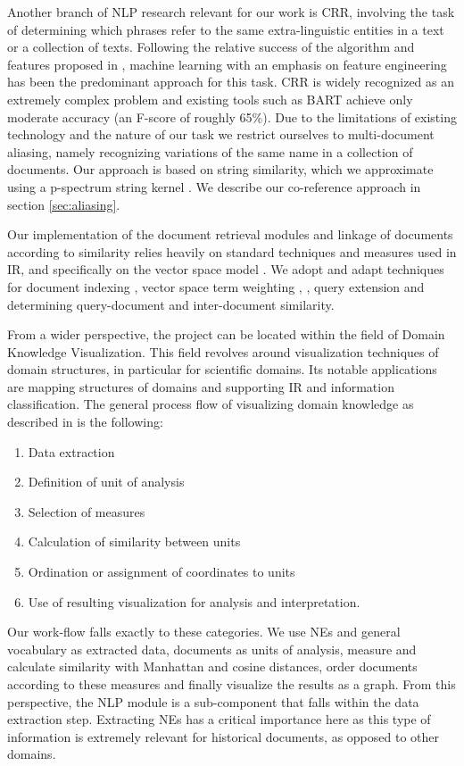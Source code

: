 Another branch of NLP research relevant for our work is CRR, involving the task of determining which phrases refer to the same extra-linguistic entities in a text or a collection of texts.
Following the relative success of the algorithm and features proposed in \cite {soon2001coreference}, machine learning 
with an emphasis on feature engineering has been the predominant approach for this task. CRR is widely 
recognized as an extremely complex problem and existing tools such as BART \cite{bart} achieve only moderate accuracy (an F-score of roughly 65\%). Due to the limitations of existing technology and the nature of our task we restrict ourselves to multi-document aliasing, namely recognizing variations of the same name in a collection of documents. Our approach is based on string similarity, 
which we approximate using a p-spectrum string kernel \cite{kernels2004}. We describe our co-reference approach in section \ref{sec:aliasing}.

Our implementation of the document retrieval modules and linkage of documents according to similarity relies heavily on standard techniques 
and measures used in IR, and specifically on the vector space model \cite{ir2008}. We adopt and adapt techniques for 
document indexing \cite{indexing1999}, vector space term weighting \cite{jones2004}, \cite{salton1971}, query extension and determining query-document and 
inter-document similarity. 

From a wider perspective, the project can be located within the field of Domain Knowledge Visualization. This field revolves around visualization
techniques of domain structures, in particular for scientific domains. Its notable applications are mapping structures of domains and supporting
IR and information classification.
The general process flow of visualizing domain knowledge as described in
\cite{visualizing2003} is the following: 
\begin{enumerate}
\item Data extraction 
\item Definition of unit of analysis 
\item Selection of measures 
\item Calculation of similarity between units 
\item Ordination or assignment of coordinates to units 
\item Use of resulting visualization for analysis and interpretation.
\end{enumerate}
Our work-flow falls exactly to these categories. We use NEs and general vocabulary as extracted data, documents as units of analysis, measure and calculate similarity with Manhattan and cosine distances, order documents according to these measures and finally visualize the results as a graph.
From this perspective, the NLP module is a sub-component that falls within the data extraction step. Extracting NEs has a critical importance
here as this type of information is extremely relevant for historical documents, as opposed to other domains.  

